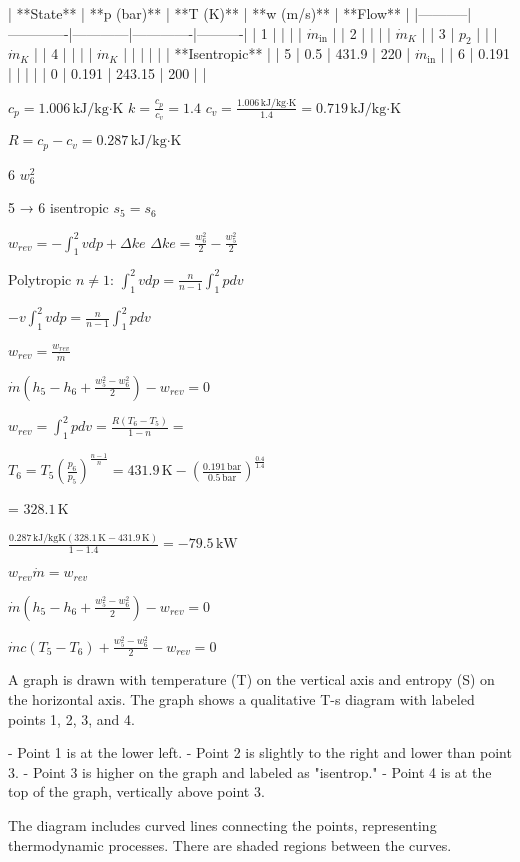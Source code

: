 | **State** | **p (bar)** | **T (K)** | **w (m/s)** | **Flow** |  
|-----------|-------------|------------|-------------|----------|  
| 1         |             |            |             | \( \dot{m}_{\text{in}} \) |  
| 2         |             |            |             | \( \dot{m}_K \) |  
| 3         | \( p_2 \)   |            |             | \( \dot{m}_K \) |  
| 4         |             |            |             | \( \dot{m}_K \) |  
|           |             |            |             | **Isentropic** |  
| 5         | 0.5         | 431.9      | 220         | \( \dot{m}_{\text{in}} \) |  
| 6         | 0.191       |            |             |            |  
| 0         | 0.191       | 243.15     | 200         |            |  

\( c_p = 1.006 \, \text{kJ/kg·K} \)  
\( k = \frac{c_p}{c_v} = 1.4 \)  
\( c_v = \frac{1.006 \, \text{kJ/kg·K}}{1.4} = 0.719 \, \text{kJ/kg·K} \)  

\( R = c_p - c_v = 0.287 \, \text{kJ/kg·K} \)

6 \( w_6^2 \)  

5 → 6 isentropic  
\( s_5 = s_6 \)  

\( w_{rev} = - \int_1^2 v dp + \Delta ke \)  
\( \Delta ke = \frac{w_6^2}{2} - \frac{w_5^2}{2} \)  

Polytropic \( n \neq 1 \):  
\( \int_1^2 v dp = \frac{n}{n-1} \int_1^2 p dv \)  

\( - v \int_1^2 v dp = \frac{n}{n-1} \int_1^2 p dv \)  

\( w_{rev} = \frac{w_{rev}}{\dot{m}} \)  

\( \dot{m} \left( h_5 - h_6 + \frac{w_5^2 - w_6^2}{2} \right) - w_{rev} = 0 \)  

\( w_{rev} = \int_1^2 p dv = \frac{R (T_6 - T_5)}{1 - n} = \)  

\( T_6 = T_5 \left( \frac{p_6}{p_5} \right)^{\frac{n-1}{n}} = 431.9 \, \text{K} - \left( \frac{0.191 \, \text{bar}}{0.5 \, \text{bar}} \right)^{\frac{0.4}{1.4}} \)  

= \( 328.1 \, \text{K} \)  

\( \frac{0.287 \, \text{kJ/kgK} (328.1 \, \text{K} - 431.9 \, \text{K})}{1 - 1.4} = -79.5 \, \text{kW} \)  

\( w_{rev} \dot{m} = w_{rev} \)  

\( \dot{m} \left( h_5 - h_6 + \frac{w_5^2 - w_6^2}{2} \right) - w_{rev} = 0 \)  

\( \dot{m} c (T_5 - T_6) + \frac{w_5^2 - w_6^2}{2} - w_{rev} = 0 \)

A graph is drawn with temperature (T) on the vertical axis and entropy (S) on the horizontal axis. The graph shows a qualitative T-s diagram with labeled points 1, 2, 3, and 4.  

- Point 1 is at the lower left.  
- Point 2 is slightly to the right and lower than point 3.  
- Point 3 is higher on the graph and labeled as "isentrop."  
- Point 4 is at the top of the graph, vertically above point 3.  

The diagram includes curved lines connecting the points, representing thermodynamic processes. There are shaded regions between the curves.